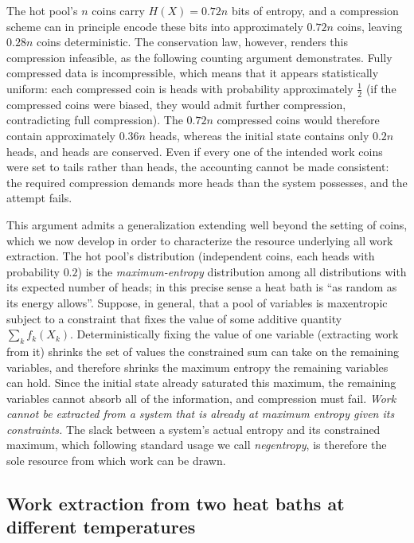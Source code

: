 \documentclass[10pt]{article}
\theoremstyle{definition}
\theoremstyle{remark}
\begin{document}
The hot pool's $n$ coins carry $H(X) = 0.72n$ bits of entropy, and a compression scheme can in principle encode these bits into approximately $0.72n$ coins, leaving $0.28n$ coins deterministic. The conservation law, however, renders this compression infeasible, as the following counting argument demonstrates. Fully compressed data is incompressible, which means that it appears statistically uniform: each compressed coin is heads with probability approximately $\frac12$ (if the compressed coins were biased, they would admit further compression, contradicting full compression). The $0.72n$ compressed coins would therefore contain approximately $0.36n$ heads, whereas the initial state contains only $0.2n$ heads, and heads are conserved. Even if every one of the intended work coins were set to tails rather than heads, the accounting cannot be made consistent: the required compression demands more heads than the system possesses, and the attempt fails.

This argument admits a generalization extending well beyond the setting of coins, which we now develop in order to characterize the resource underlying all work extraction. The hot pool's distribution (independent coins, each heads with probability $0.2$) is the \emph{maximum-entropy} distribution among all distributions with its expected number of heads; in this precise sense a heat bath is ``as random as its energy allows''. Suppose, in general, that a pool of variables is maxentropic subject to a constraint that fixes the value of some additive quantity $\sum_k f_k(X_k)$. Deterministically fixing the value of one variable (extracting work from it) shrinks the set of values the constrained sum can take on the remaining variables, and therefore shrinks the maximum entropy the remaining variables can hold. Since the initial state already saturated this maximum, the remaining variables cannot absorb all of the information, and compression must fail. \emph{Work cannot be extracted from a system that is already at maximum entropy given its constraints.} The slack between a system's actual entropy and its constrained maximum, which following standard usage we call \emph{negentropy}, is therefore the sole resource from which work can be drawn.

\subsection{Work extraction from two heat baths at different temperatures}
\label{sec:twobaths}
\end{document}

